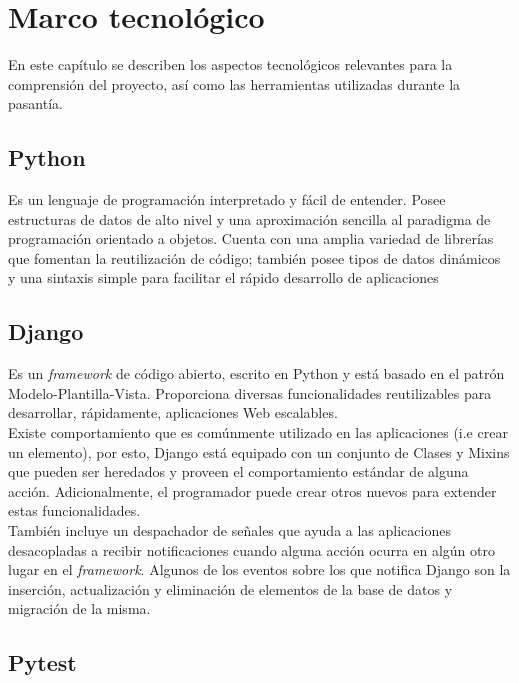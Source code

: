 \chapter{\textbf{Marco tecnológico}}

\thispagestyle{empty}

En este capítulo se describen los aspectos tecnológicos relevantes para la comprensión del proyecto, así como las herramientas utilizadas durante la pasantía.


\section{Python}

Es un lenguaje de programación interpretado y fácil de entender. Posee estructuras de datos de alto nivel y una aproximación sencilla al paradigma de programación orientado a objetos. Cuenta con una amplia variedad de librerías que fomentan la reutilización de código; también posee tipos de datos dinámicos y una sintaxis simple para facilitar el rápido desarrollo de aplicaciones 
 \cite{Python_tutorial}

\section{Django}

Es un \textit{framework} de código abierto, escrito en Python y está basado en el patrón Modelo-Plantilla-Vista. Proporciona diversas funcionalidades reutilizables para desarrollar, rápidamente, aplicaciones Web escalables. \cite{MVT}\\ %

Existe comportamiento que es comúnmente utilizado en las aplicaciones (i.e crear un elemento), por esto, Django está equipado con un conjunto de Clases y Mixins que pueden ser heredados y proveen el comportamiento estándar de alguna acción. Adicionalmente, el programador puede crear otros nuevos para extender estas funcionalidades.\\

También incluye un despachador de señales que ayuda a las aplicaciones desacopladas a recibir notificaciones cuando alguna acción ocurra en algún otro lugar en el \textit{framework}. Algunos de los  eventos sobre los que notifica Django son la inserción, actualización y eliminación de elementos de la base de datos y migración de la misma.

\section{Pytest}

